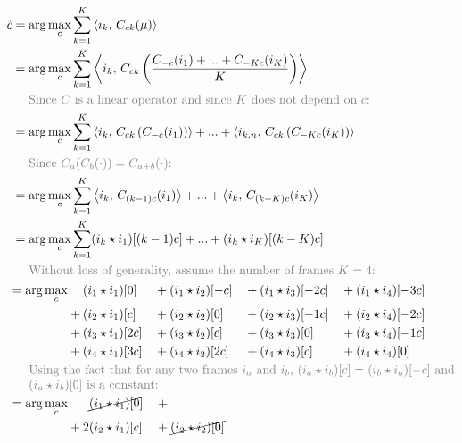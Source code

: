 \documentclass[tocnosub,noragright,centerchapter,12pt]{uiucecethesis09}
\begin{document}
\begin{align*}
  \hat{c} &= \arg \max_c \sum_{k=1}^K \ip{i_k}{C_{ck}(\mu)} \\
  &= \arg \max_c \sum_{k=1}^K \ip{i_k}{C_{ck}\left(\frac{C_{-c}(i_1) +  ... + C_{-Kc}(i_K)}{K}\right)} \\
  & \eqlinecomment{Since $C$ is a linear operator and since $K$ does not depend on $c$:} \\
  &= \arg \max_c \sum_{k=1}^K \ip{i_k}{C_{ck}\left(C_{-c}(i_1)\right)} +  ... + \ip{i_{k,n}}{C_{ck}\left(C_{-Kc}(i_K)\right)} \\
  & \eqlinecomment{Since $C_a(C_b(\cdot)) = C_{a+b}(\cdot)$:} \\
  &= \arg \max_c \sum_{k=1}^K \ip{i_k}{C_{(k-1)c}(i_1)} +  ... +  \ip{i_k}{C_{(k-K)c}(i_K)} \\
  &= \arg \max_c \sum_{k=1}^K (i_k \star i_1) [(k - 1)c] + ... + (i_k \star i_K)[(k - K)c] \\
  & \eqlinecomment{Without loss of generality, assume the number of frames $K=4$:} \\
  & \begin{aligned}
    = \arg \max_c &\hphantom{{}+{}}
           (i_1 \star i_1)[0]  & {}+{} & (i_1 \star i_2)[-c] & {}+{} & (i_1 \star i_3)[-2c] & {}+{} & (i_1 \star i_4)[-3c] \\
    &{}+{} (i_2 \star i_1)[c]  & {}+{} & (i_2 \star i_2)[0]  & {}+{} & (i_2 \star i_3)[-1c] & {}+{} & (i_2 \star i_4)[-2c] \\
    &{}+{} (i_3 \star i_1)[2c] & {}+{} & (i_3 \star i_2)[c]  & {}+{} & (i_3 \star i_3)[0]   & {}+{} & (i_3 \star i_4)[-1c] \\
    &{}+{} (i_4 \star i_1)[3c] & {}+{} & (i_4 \star i_2)[2c] & {}+{} & (i_4 \star i_3)[c]   & {}+{} & (i_4 \star i_4)[0] \\
  \end{aligned} \\
  & \eqlinecomment{Using the fact that for any two frames $i_a$ and $i_b$, $(i_a \star i_b)[c] = (i_b \star i_a)[-c]$ and $(i_a \star i_b)[0]$ is a constant:} \\
  & \begin{aligned}
      = \arg \max_c &\hphantom{{}+{} 2}
      \cancel{(i_1 \star i_1)[0]} & {}+{}  &                              &                                       &                                       \\
      &{}+{} 2(i_2 \star i_1)[c]  & {}+{}  &  \cancel{(i_2 \star i_2)[0]} &                                       &                                       \\

\end{aligned}
\end{align*}
\end{document}
